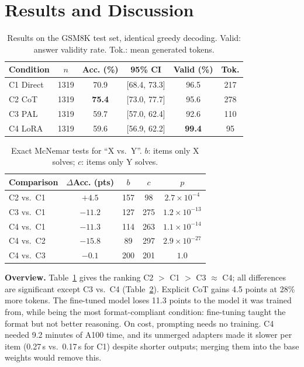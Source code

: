 \documentclass[conference]{IEEEtran}
\begin{document}
\section{Results and Discussion}
\begin{table}[t]\centering
\caption{Results on the GSM8K test set, identical greedy decoding. Valid: answer validity rate.
Tok.: mean generated tokens.}\label{tab:main}
\setlength{\tabcolsep}{3.6pt}
\begin{tabular}{lccccc}\toprule
Condition & $n$ & Acc. (\%) & 95\% CI & Valid (\%) & Tok. \\\midrule
C1 Direct & 1319 & 70.9 & [68.4, 73.3] & 96.5 & 217 \\
C2 CoT    & 1319 & \textbf{75.4} & [73.0, 77.7] & 95.6 & 278 \\
C3 PAL    & 1319 & 59.7 & [57.0, 62.4] & 92.6 & 110 \\
C4 LoRA   & 1319 & 59.6 & [56.9, 62.2] & \textbf{99.4} & 95 \\\bottomrule
\end{tabular}\end{table}

\begin{table}[t]\centering
\caption{Exact McNemar tests for ``X vs.\ Y''. $b$: items only X solves; $c$: items only Y solves.}\label{tab:mcnemar}
\begin{tabular}{lcccc}\toprule
Comparison & $\Delta$Acc. (pts) & $b$ & $c$ & $p$ \\\midrule
C2 vs.\ C1 & $+4.5$  & 157 & 98  & $2.7{\times}10^{-4}$ \\
C3 vs.\ C1 & $-11.2$ & 127 & 275 & $1.2{\times}10^{-13}$ \\
C4 vs.\ C1 & $-11.3$ & 114 & 263 & $1.1{\times}10^{-14}$ \\
C4 vs.\ C2 & $-15.8$ & 89  & 297 & $2.9{\times}10^{-27}$ \\
C4 vs.\ C3 & $-0.1$  & 200 & 201 & $1.0$ \\\bottomrule
\end{tabular}\end{table}

\textbf{Overview.} Table~\ref{tab:main} gives the ranking C2 $>$ C1 $>$ C3 $\approx$ C4; all differences are
significant except C3 vs.\ C4 (Table~\ref{tab:mcnemar}). Explicit CoT gains 4.5 points at 28\% more
tokens. The fine-tuned model loses 11.3 points to the model it was trained from, while being the most
format-compliant condition: fine-tuning taught the format but not better reasoning. On cost, prompting needs
no training. C4 needed 9.2 minutes of A100 time, and its unmerged adapters made it slower per item
(0.27\,s vs.\ 0.17\,s for C1) despite shorter outputs; merging them into the base weights would remove this.
\end{document}
